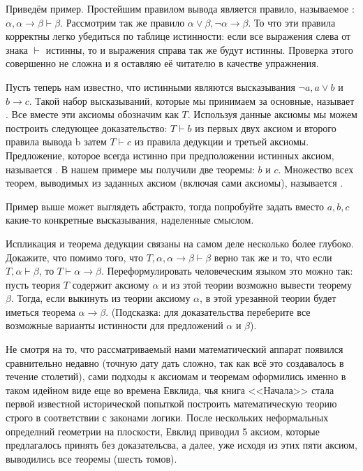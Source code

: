 Приведём пример. Простейшим правилом вывода является правило, называемое : $\alpha, \alpha\to\beta \vdash \beta$. Рассмотрим так же правило $\alpha\lor\beta, \neg\alpha \to \beta$. То что эти правила корректны легко убедиться по таблице истинности: если все выражения слева от знака $\vdash$ истинны, то и выражения справа так же будут истинны. Проверка этого совершенно не сложна и я оставляю её читателю в качестве упражнения.

Пусть теперь нам известно, что истинными являются высказывания $\neg a, a\lor b$ и $b\to c$. Такой набор высказываний, которые мы принимаем за основные, называет . Все вместе эти аксиомы обозначим как $T$. Используя данные аксиомы мы можем построить следующее доказательство: $T\vdash b$ из первых двух аксиом и второго правила вывода b затем $T\vdash c$ из правила дедукции и третьей аксиомы. Предложение, которое всегда истинно при предположении истинных аксиом, называется . В нашем примере мы получили две теоремы: $b$ и $c$. Множество всех теорем, выводимых из заданных аксиом (включая сами аксиомы), называется .

\begin{exercise}
Пример выше может выглядеть абстракто, тогда попробуйте задать вместо $a, b, c$ какие-то конкретные высказывания, наделенные смыслом.
\end{exercise}

\begin{exercise}
Испликация и теорема дедукции связаны на самом деле несколько более глубоко. Докажите, что помимо того, что $T, \alpha, \alpha\to\beta\vdash \beta$ верно так же и то, что если $T, \alpha \vdash \beta$, то $T \vdash \alpha\to\beta$. Переформулировать человеческим языком это можно так: пусть теория $T$ содержит аксиому $\alpha$ и из этой теории возможно вывести теорему $\beta$. Тогда, если выкинуть из теории аксиому $\alpha$, в этой урезанной теории будет иметься теорема $\alpha\to\beta$. (Подсказка: для доказательства переберите все возможные варианты истинности для предложений $\alpha$ и $\beta$).
\end{exercise}

Не смотря на то, что рассматриваемый нами математический аппарат появился сравнительно недавно (точную дату дать сложно, так как всё это создавалось в течение столетий), сами подходы к аксиомам и теоремам оформились именно в таком идейном виде еще во времена Евклида, чья книга <<Начала>> стала первой известной исторической попыткой построить математическую теорию строго в соответствии с законами логики. После нескольких неформальных определний геометрии на плоскости, Евклид приводил 5 аксиом, которые предлагалось принять без доказательсва, а далее, уже исходя из этих пяти аксиом, выводились все теоремы (шесть томов).

